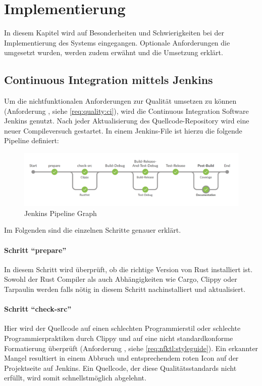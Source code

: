 
\chapter{Implementierung}

In diesem Kapitel wird auf Besonderheiten und Schwierigkeiten bei der Implementierung des Systems eingegangen.
Optionale Anforderungen die umgesetzt wurden, werden zudem erwähnt und die Umsetzung erklärt.



\section{Continuous Integration mittels Jenkins}

Um die nichtfunktionalen Anforderungen zur Qualität umsetzen zu können (Anforderung , siehe \autoref{req:quality:ci}), wird die Continuous Integration Software Jenkins genutzt.
Nach jeder Aktualisierung des Quellcode-Repository wird eine neuer Compileversuch gestartet.
In einem Jenkins-File ist hierzu die folgende Pipeline definiert:

\begin{figure}[H]
	\includegraphics[width=\textwidth]{images/jenkins_pipeline_graph.png}
	\caption{Jenkins Pipeline Graph}
	\label{impl:jenkins:pipeline:graph}
\end{figure}

Im Folgenden sind die einzelnen Schritte genauer erklärt.


\subsubsection{Schritt \enquote{prepare}}
In diesem Schritt wird überprüft, ob die richtige Version von Rust installiert ist.
Sowohl der Rust Compiler als auch Abhängigkeiten wie Cargo, Clippy oder Tarpaulin werden falls nötig  in diesem Schritt nachinstalliert und aktualisiert.

\subsubsection{Schritt \enquote{check-src}}
Hier wird der Quellcode auf einen schlechten Programmierstil oder schlechte Programmierpraktiken durch Clippy und auf eine nicht standardkonforme Formatierung überprüft (Anforderung , siehe \autoref{req:nfktl:styleguide}).
Ein erkannter Mangel resultiert in einem Abbruch und entsprechendem roten Icon auf der Projektseite auf Jenkins.
Ein Quellcode, der diese Qualitätsstandards nicht erfüllt, wird somit schnellstmöglich abgelehnt.


